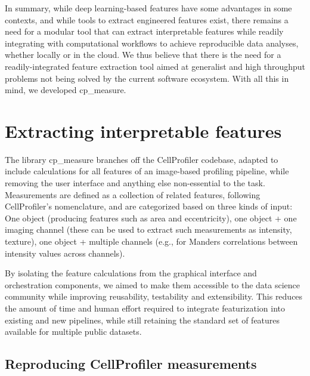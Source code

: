 \documentclass{article}
\begin{document}
In summary, while deep learning-based features have some advantages in some contexts, and while tools to extract engineered features exist, there remains a need for a modular tool that can extract interpretable features while readily integrating with computational workflows to achieve reproducible data analyses, whether locally or in the cloud. We thus believe that there is the need for a readily-integrated feature extraction tool aimed at generalist and high throughput problems not being solved by the current software ecosystem. With all this in mind, we developed cp\_measure.


\section{Extracting interpretable features}
\label{sec:org61842b5}
The library cp\_measure branches off the CellProfiler codebase, adapted to include calculations for all features of an image-based profiling pipeline, while removing the user interface and anything else non-essential to the task. Measurements are defined as a collection of related features, following CellProfiler's nomenclature, and are categorized based on three kinds of input: One object (producing features such as area and eccentricity), one object + one imaging channel (these can be used to extract such measurements as intensity, texture), one object + multiple channels (e.g., for Manders correlations between intensity values across channels).

By isolating the feature calculations from the graphical interface and orchestration components, we aimed to make them accessible to the data science community while improving reusability, testability and extensibility. This reduces the amount of time and human effort required to integrate featurization into existing and new pipelines, while still retaining the standard set of features available for multiple public datasets.

\subsection{Reproducing CellProfiler measurements}
\label{sec:org09b0cd2}
\end{document}
